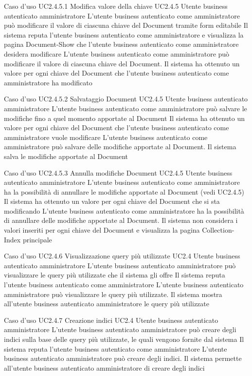 \UCtitle
{Caso d'uso UC2.4.5.1}
{Modifica valore della chiave}
\UC
{UC2.4.5}
{Utente business autenticato amministratore}
{L'utente business autenticato come amministratore può modificare il valore di ciascuna chiave del Document tramite form editabile}
{Il sistema reputa l'utente business autenticato come amministratore e visualizza la pagina Document-Show che l'utente business autenticato come amministratore desidera modificare}
\scenario
{L'utente business autenticato come amministratore può modificare il valore di ciascuna chiave del Document.}
\post
{Il sistema ha ottenuto un valore per ogni chiave del Document che l'utente business autenticato come amministratore ha modificato}

\UCtitle
{Caso d'uso UC2.4.5.2}
{Salvataggio Document}
\UC
{UC2.4.5}
{Utente business autenticato amministratore}
{L'utente business autenticato come amministratore può salvare le modifiche fino a quel momento apportate al Document}
{Il sistema ha ottenuto un valore per ogni chiave del Document che l'utente business autenticato come amministratore vuole modificare}
\scenario
{L'utente business autenticato come amministratore può salvare delle modifiche apportate al Document.}
\post
{Il sistema salva le modifiche apportate al Document}

\UCtitle
{Caso d'uso UC2.4.5.3}
{Annulla modifiche Document}
\UC
{UC2.4.5}
{Utente business autenticato amministratore}
{L'utente business autenticato come amministratore ha la possibilità di annullare le modifiche apportate al Document (vedi UC2.4.5)}
{Il sistema ha ottenuto un valore per ogni chiave del Document che si sta modificando}
\scenario
{L'utente business autenticato come amministratore ha la possibilità di annullare delle modifiche apportate al Document.}
\post
{Il sistema non considera i valori inseriti per ogni chiave del Document e visualizza la pagina Collection-Index principale}

\UCtitle
{Caso d'uso UC2.4.6}
{Visualizzazione query più utilizzate}
\UC
{UC2.4}
{Utente business autenticato amministratore}
{L'utente business autenticato amministratore può visualizzare le query più utilizzate che il sistema gli offre}
{Il sistema reputa l'utente business autenticato come amministratore}
\scenario
{L'utente business autenticato amministratore può visualizzare le query più utilizzate.}
\post
{Il sistema mostra all'utente business autenticato amministratore le query più utilizzate}

\UCtitle
{Caso d'uso UC2.4.7}
{Creazione indici}
\UC
{UC2.4}
{Utente business autenticato amministratore}
{L'utente business autenticato amministratore può creare degli indici sulla base delle query più utilizzate, le quali vengono fornite dal sistema}
{Il sistema reputa l'utente business autenticato come amministratore}
\scenario
{L'utente business autenticato amministratore può creare degli indici.}
\post
{Il sistema permette all'utente business autenticato amministratore di creare degli indici}

